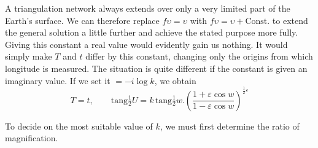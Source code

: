 \par\indent{}%
A triangulation network always extends over only a very limited part of the Earth’s surface. We can therefore replace \(f\upsilon=\upsilon\) with \(f\upsilon=\upsilon+\text{Const.}\) to extend the general solution a little further and achieve the stated purpose more fully. Giving this constant a real value would evidently gain us nothing. It would simply make \(T\) and \(t\) differ by this constant, changing only the origins from which longitude is measured. The situation is quite different if the constant is given an imaginary value. If we set it \(=-i\log k\), we obtain
\[
T=t,\qquad \mathrm{tang}\tfrac{1}{2}U=k\,\mathrm{tang}\tfrac{1}{2}w\mathord{.}(\frac{1+\varepsilon\cos w}{1-\varepsilon\cos w})^{\frac{1}{2}\varepsilon}
\]
\par\indent To decide on the most suitable value of \(k\), we must first determine the ratio of magnification.

